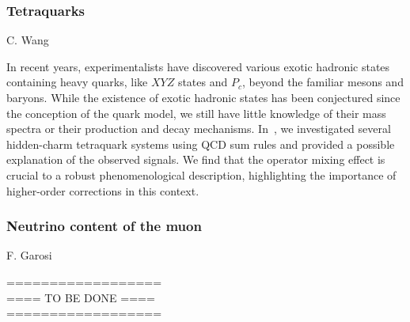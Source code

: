 \documentclass{FBR_Bericht_2025}
\begin{document}
\begin{refsection}
\subsubsection{Tetraquarks}
\begin{Namen}
C. Wang
\end{Namen}
%
In recent years, experimentalists have discovered various exotic hadronic states containing heavy quarks, like $X Y Z$ states and $P_{c}$, beyond the familiar mesons and baryons.
While the existence of exotic hadronic states has been conjectured since the conception of the quark model, we still have little knowledge of their mass spectra or their production and decay mechanisms.
In~\cite{Wu:2023ntn}, we investigated several hidden-charm tetraquark systems using QCD sum rules and provided a possible explanation of the observed signals.
We find that the operator mixing effect is crucial to a robust phenomenological description, highlighting the importance of higher-order corrections in this context.
%
\subsubsection{Neutrino content of the muon}
\begin{Namen}
F. Garosi
\end{Namen}
%
{\color{red} ==================\\ ====\; TO BE DONE\; ====\\ ==================}
%
\printbibliography[heading=subbibliography]
\end{refsection}

\end{document}
